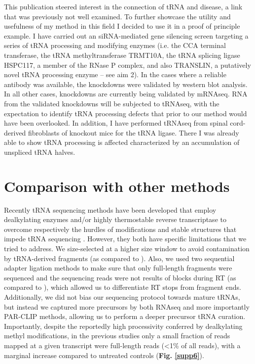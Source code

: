 \documentclass[12pt]{rockefeller}
\begin{document}
This publication steered interest in the connection of tRNA and disease, a link that was previously not well examined. To further showcase the utility and usefulness of my method in this field I decided to use it in a proof of principle example. I have carried out an siRNA-mediated gene silencing screen targeting a series of tRNA processing and modifying enzymes (i.e. the CCA terminal transferase, the tRNA methyltransferase TRMT10A, the tRNA splicing ligase HSPC117, a member of the RNase P complex, and also TRANSLIN, a putatively novel tRNA processing enzyme – see aim 2). In the cases where a reliable antibody was available, the knockdowns were validated by western blot analysis. In all other cases, knockdowns are currently being validated by mRNAseq. RNA from the validated knockdowns will be subjected to tRNAseq, with the expectation to identify tRNA processing defects that prior to our method would have been overlooked. In addition, I have performed tRNAseq from spinal cord-derived fibroblasts of knockout mice for the tRNA ligase. There I was already able to show tRNA processing is affected characterized by an accumulation of unspliced tRNA halves. 

\section{Comparison with other methods}

Recently tRNA sequencing methods have been developed that employ dealkylating enzymes and/or highly thermostable reverse transcriptase to overcome respectively the hurdles of modifications and stable structures that impede tRNA sequencing \cite{Cozen:2015ds, Zheng:2015dw}. However, they both have specific limitations that we tried to address. We size-selected at a higher size window to avoid contamination by tRNA-derived fragments (as compared to \cite{Cozen:2015ds}). Also, we used two sequential adapter ligation methods to make sure that only full-length fragments were sequenced and the sequencing reads were not results of blocks during RT (as compared to \cite{Zheng:2015dw}), which allowed us to differentiate RT stops from fragment ends. Additionally, we did not bias our sequencing protocol towards mature tRNAs, but instead we captured more precursors by both RNAseq and more importantly PAR-CLIP methods, allowing us to perform a deeper precursor tRNA curation. Importantly, despite the reportedly high processivity conferred by dealkylating methyl modifications, in the previous studies only a small fraction of reads mapped at a given transcript were full-length reads (<1\% of all reads), with a marginal increase compared to untreated controls (\textbf{Fig. \ref{supp6}}). 
\end{document}
